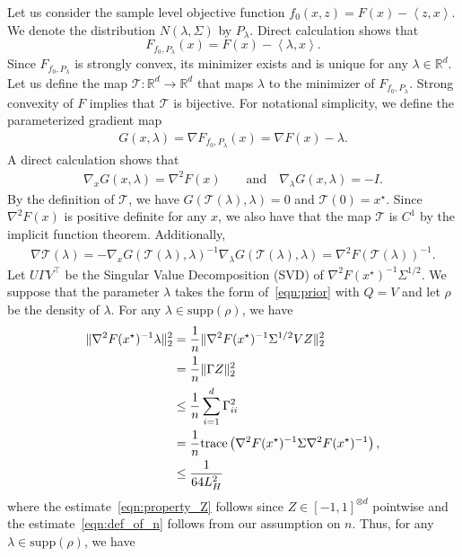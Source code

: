 \documentclass[11pt,twoside]{article}
\numberwithin{equation}{section}
\newcommand{\trace}[1]{\mathrm{trace}\left(#1\right)}
\newcommand{\RR}{\mathbb{R}}
\newcommand{\cT}{\mathcal{T}}
\newcommand{\1}{\mathbf{1}}
\newcommand{\dotp}[1]{\left\langle #1\right\rangle}
\theoremstyle{remark}
\theoremstyle{plain}
\newcommand{\supp}{\mathrm{supp}}
\newcommand{\liph}{L_H}
\begin{document}
Let us consider the sample level objective function  $f_0(x, z) = F(x) - \dotp{z,x}$. We denote the distribution $N(\lambda,\Sigma)$ by $P_\lambda$.  Direct calculation shows that $$F_{f_0,P_{\lambda}}(x) = F(x) - \dotp{\lambda, x}.$$ 
Since $F_{f_0,P_{\lambda}}$ is strongly convex, its minimizer exists and is unique for any $\lambda \in \RR^d$. Let us define the map $\cT:\RR^d \rightarrow \RR^d$ that maps $\lambda$ to the minimizer of $F_{f_0,P_\lambda}$.  Strong convexity of $F$  implies that $\cT$ is bijective. For notational simplicity, we define the parameterized gradient map 
\begin{align*}
	G(x, \lambda) = \nabla F_{f_0,P_\lambda}(x) = \nabla F(x) - \lambda. 
\end{align*}                         
A direct calculation shows that 
\begin{align*}
	\nabla_x G(x,\lambda) = \nabla^2 F(x) \qquad \text{and} \quad \nabla_\lambda G(x,\lambda) = -I.
\end{align*}
By the definition of $\cT$, we have $G(\cT(\lambda), \lambda) = 0$ and $\cT(0) = x^\star$. Since $\nabla^2 F(x)$ is positive definite for any $x$, we also have that the map $\cT$ is $C^1$ by the implicit function theorem. Additionally, 
\begin{align}\label{eqn: gradientofg}
	\nabla \cT(\lambda) = - \nabla_x G(\cT(\lambda), \lambda)^{-1} \nabla_\lambda G(\cT(\lambda), \lambda) = \nabla^2 F(\cT(\lambda))^{-1}.
\end{align}        
Let $U \Gamma V^\top$ be the Singular Value Decomposition (SVD) of $\nabla^2 F(x^\star)^{-1} \Sigma^{1/2}$. We suppose that the parameter $\lambda$ takes the form of~\eqref{eqn:prior} with $Q=V$ and let $\rho$ be the density of $\lambda$. For any $\lambda \in \supp(\rho)$, we have
\begin{align}
	\|\nabla^2 F(x^\star)^{-1} \lambda\|_2^2 &= \frac{1}{n} \|\nabla^2 F(x^\star)^{-1} \Sigma^{1/2} V Z\|_2^2 \notag\\
	&= \frac{1}{n} \|\Gamma Z\|_2^2\notag\\
	&\le \frac{1}{n} \sum_{i=1}^{d} \Gamma_{ii}^2 \label{eqn:property_Z}\\
	&= \frac{1}{n} \trace{\nabla^2 F(x^\star)^{-1} \Sigma \nabla^2 F(x^\star)^{-1}},\label{eqn:def_of_n_tight}\\
	&\le \frac{1}{64 \liph^2} \label{eqn:def_of_n}
\end{align}
where the estimate~\eqref{eqn:property_Z} follows since $Z \in [-1,1]^{\otimes d}$ pointwise and the estimate~\eqref{eqn:def_of_n} follows from our assumption on $n$. Thus, for any $\lambda \in \supp(\rho)$, we have 
\end{document}
